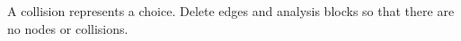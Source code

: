 A collision represents a choice.
Delete edges and analysis blocks so that there are no nodes or collisions.





		
